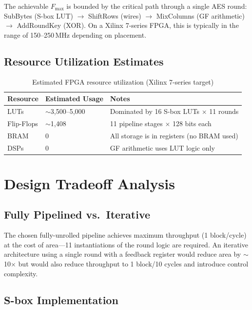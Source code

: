 \documentclass[12pt,a4paper]{article}
\begin{document}
The achievable $F_{\max}$ is bounded by the critical path through a single
AES round: SubBytes (S-box LUT) $\to$ ShiftRows (wires) $\to$ MixColumns
(GF arithmetic) $\to$ AddRoundKey (XOR). On a Xilinx 7-series FPGA, this
is typically in the range of 150--250\,MHz depending on placement.

\subsection{Resource Utilization Estimates}

\begin{table}[H]
\centering
\begin{tabular}{@{}lll@{}}
\toprule
\textbf{Resource} & \textbf{Estimated Usage} & \textbf{Notes}\\
\midrule
LUTs       & $\sim$3,500--5,000 & Dominated by 16 S-box LUTs $\times$ 11 rounds\\
Flip-Flops & $\sim$1,408        & 11 pipeline stages $\times$ 128 bits each\\
BRAM       & 0                  & All storage is in registers (no BRAM used)\\
DSPs       & 0                  & GF arithmetic uses LUT logic only\\
\bottomrule
\end{tabular}
\caption{Estimated FPGA resource utilization (Xilinx 7-series target)}
\end{table}

\section{Design Tradeoff Analysis}

\subsection{Fully Pipelined vs.\ Iterative}

The chosen fully-unrolled pipeline achieves maximum throughput (1 block/cycle)
at the cost of area---11 instantiations of the round logic are required.
An iterative architecture using a single round with a feedback register would
reduce area by $\sim$10$\times$ but would also reduce throughput to
1 block/10 cycles and introduce control complexity.

\subsection{S-box Implementation}
\end{document}
